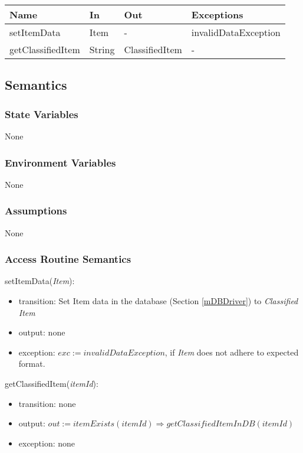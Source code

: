 \documentclass[12pt, titlepage]{article}
\begin{document}
\begin{center}
    \begin{tabular}{p{5cm} p{4cm} p{3cm} p{4cm}}
    \hline
    \textbf{Name} & \textbf{In} & \textbf{Out} & \textbf{Exceptions} \\
    \hline
    setItemData & Item & - & invalidDataException \\
    getClassifiedItem & String & ClassifiedItem & - \\
    \hline
    \end{tabular}
\end{center}

\subsection{Semantics}

\subsubsection{State Variables}

None

\subsubsection{Environment Variables}

None

\subsubsection{Assumptions}

None

\subsubsection{Access Routine Semantics}

\noindent setItemData(\textit{Item}):
\begin{itemize}
  \item transition: Set Item data in the database (Section \ref{mDBDriver}) to \textit{Classified Item}
  \item output: none
  \item exception: $exc := invalidDataException$, if \textit{Item} does not adhere to expected format.
  \end{itemize}

\noindent getClassifiedItem(\textit{itemId}):
\begin{itemize}
  \item transition: none
  \item output: $out := \textit{itemExists}(\textit{itemId}) \Rightarrow \textit{getClassifiedItemInDB}(\textit{itemId})$
  \item exception: none
\end{itemize}
\end{document}
